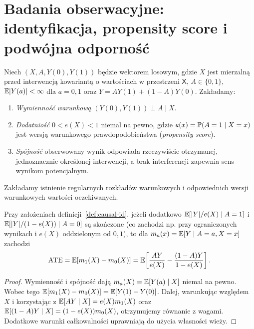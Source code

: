 \section{Badania obserwacyjne: identyfikacja, propensity score i podwójna odporność}
\begin{definicja}\label{def:causal-id}
Niech $(X,A,Y(0),Y(1))$ będzie wektorem losowym, gdzie $X$ jest mierzalną przed interwencją kowariantą o wartościach w przestrzeni $\mathsf X$, $A\in\{0,1\}$, $\mathbb E|Y(a)|<\infty$ dla $a=0,1$ oraz $Y=AY(1)+(1-A)Y(0)$. Zakładamy:
\begin{enumerate}
\item \emph{Wymienność warunkową} $(Y(0),Y(1))\perp A\mid X$.
\item \emph{Dodatniość} $0<e(X)<1$ niemal na pewno, gdzie $e(x)=\mathbb P(A=1\mid X=x)$ jest wersją warunkowego prawdopodobieństwa (\emph{propensity score}).
\item \emph{Spójność} obserwowany wynik odpowiada rzeczywiście otrzymanej, jednoznacznie określonej interwencji, a brak interferencji zapewnia sens wynikom potencjalnym.
\end{enumerate}
Zakładamy istnienie regularnych rozkładów warunkowych i odpowiednich wersji warunkowych wartości oczekiwanych.
\end{definicja}

\begin{twierdzenie}\label{thm:causal-ipw}
Przy założeniach definicji~\ref{def:causal-id}, jeżeli dodatkowo $\mathbb E[|Y|/e(X)\mid A=1]$ i $\mathbb E[|Y|/(1-e(X))\mid A=0]$ są skończone (co zachodzi np. przy ograniczonych wynikach i $e(X)$ oddzielonym od $0,1$), to dla $m_a(x)=\mathbb E[Y\mid A=a,X=x]$ zachodzi
\[
 \mathrm{ATE}=\mathbb E[m_1(X)-m_0(X)]
 =\mathbb E\!\left[\frac{AY}{e(X)}-\frac{(1-A)Y}{1-e(X)}\right].
\]
\end{twierdzenie}
\begin{proof}
Wymienność i spójność dają $m_a(X)=\mathbb E[Y(a)\mid X]$ niemal na pewno. Wobec tego $\mathbb E[m_1(X)-m_0(X)]=\mathbb E[Y(1)-Y(0)]$. Dalej, warunkując względem $X$ i korzystając z $\mathbb E[A Y\mid X]=e(X)m_1(X)$ oraz $\mathbb E[(1-A)Y\mid X]=(1-e(X))m_0(X)$, otrzymujemy równanie z wagami. Dodatkowe warunki całkowalności uprawniają do użycia własności wieży.
\end{proof}

